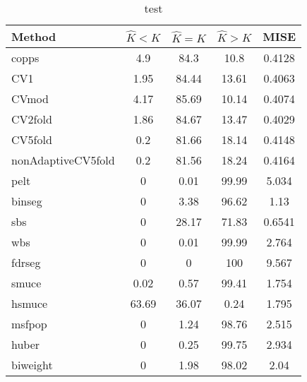 \begin{table}[ht]
\centering
\begin{tabular}{l|cccc}
  \hline
Method & $\hat{K} < K$ & $\hat{K} = K$ & $\hat{K} > K$ & MISE \\ 
  \hline
copps &   4.9 &  84.3 &  10.8 & 0.4128 \\ 
  CV1 &  1.95 & 84.44 & 13.61 & 0.4063 \\ 
  CVmod &  4.17 & 85.69 & 10.14 & 0.4074 \\ 
  CV2fold &  1.86 & 84.67 & 13.47 & 0.4029 \\ 
  CV5fold &   0.2 & 81.66 & 18.14 & 0.4148 \\ 
  nonAdaptiveCV5fold &   0.2 & 81.56 & 18.24 & 0.4164 \\ 
  pelt &     0 &  0.01 & 99.99 & 5.034 \\ 
  binseg &     0 &  3.38 & 96.62 &  1.13 \\ 
  sbs &     0 & 28.17 & 71.83 & 0.6541 \\ 
  wbs &     0 &  0.01 & 99.99 & 2.764 \\ 
  fdrseg &     0 &     0 &   100 & 9.567 \\ 
  smuce &  0.02 &  0.57 & 99.41 & 1.754 \\ 
  hsmuce & 63.69 & 36.07 &  0.24 & 1.795 \\ 
  msfpop &     0 &  1.24 & 98.76 & 2.515 \\ 
  huber &     0 &  0.25 & 99.75 & 2.934 \\ 
  biweight &     0 &  1.98 & 98.02 &  2.04 \\ 
   \hline
\end{tabular}
\caption{test} 
\end{table}
